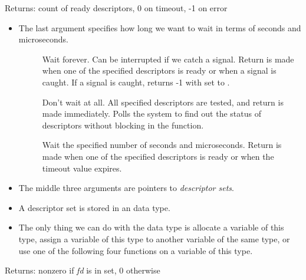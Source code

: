 \documentclass[]{article}
\begin{document}

Returns: count of ready descriptors, 0 on timeout, -1 on error

\begin{itemize}
\item The last argument specifies how long we want to wait in terms of seconds
and microseconds.
\begin{description}
\item[] Wait forever. Can be interrupted if we catch a
signal. Return is made when one of the specified descriptors is ready or when a
signal is caught. If a signal is caught, returns -1 with  set to
.
\item[] Don't wait at all.
All specified descriptors are tested, and return is made immediately. Polls the
system to find out the status of descriptors without blocking in the function.
\item[] Wait the specified
number of seconds and microseconds. Return is made when one of the specified
descriptors is ready or when the timeout value expires.
\end{description}
\item The middle three arguments are pointers to \emph{descriptor sets}.
\item A descriptor set is stored in an  data type.
\item The only thing we can do with the  data type is allocate a
variable of this type, assign a variable of this type to another variable of the
same type, or use one of the following four functions on a variable of this
type.
\end{itemize}



Returns: nonzero if \emph{fd} is in set, 0 otherwise \\



\end{document}
